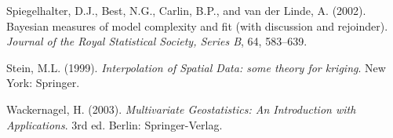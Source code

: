 \documentclass[a4paper]{article}
\begin{document}
\begin{description}
\item Spiegelhalter, D.J., Best, N.G., Carlin, B.P., and van der Linde, A. (2002). Bayesian measures of model complexity and fit (with discussion and rejoinder). \emph{Journal of the Royal Statistical Society, Series B}, 64, 583--639.

\item Stein, M.L. (1999). \emph{Interpolation of Spatial Data: some theory for kriging}. New York: Springer.

\item Wackernagel, H. (2003). \emph{Multivariate Geostatistics: An Introduction with Applications}. 3rd ed. Berlin: Springer-Verlag.
\end{description}
\end{document}
